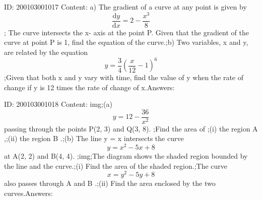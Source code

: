\documentclass{article}
\begin{document}
ID: 200103001017
Content:
a) The gradient of a curve at any point is given by \[\frac{\mathrm{d} y}{\mathrm{d} x}=2-\frac{x^{3}}{8}\];  The curve intersects the x- axis at the point P. Given that the gradient of the curve at point P is 1, find the equation of the curve.;b) Two variables, x and y, are related by the equation \[y=\frac{3}{4}(\frac{x}{12}-1)^6\];Given that both x and y vary with time, find the value of y when the rate of change if y is 12 times the rate of change of x.Answers:

ID: 200103001018
Content:
img;(a) \[y=12-\frac{36}{x^{2}}\] passing through the points P(2, 3) and Q(3, 8). ;Find the area of ;(i)	the region A ,;(ii)	the region B .;(b)	The line y = x intersects the curve \[y=x^2-5x+8\] at A(2, 2) and B(4, 4). ;img;The diagram shows the shaded region bounded by the line and the curve.;(i)	Find the area of the shaded region.;The curve \[x=y^2-5y+8\] also passes through A and B .;(ii)	Find the area enclosed by the two curves.Answers:
\end{document}
